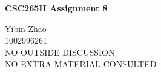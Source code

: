 \documentclass[10pt]{article}
\begin{document}
\begin{center}
{\bf \Large \bf CSC265H Assignment 8}
\end{center}

\noindent
Yibin Zhao\\
1002996261\\
NO OUTSIDE DISCUSSION\\
NO EXTRA MATERIAL CONSULTED\\

\begin{comment}
A black&white heap is a singly-linked list of binomial trees that satisfies the
following properties:
	The roots of the binomial trees in the list have strictly increasing
	degrees.
	The root of every binomial tree is white.
	If a white node is not the root of a binomial tree, its priority is greater
	than or equal to the priority of its parent.
	The black nodes all have different degrees.
	The degree od a black node is 1 less than the degree of its parent, i.e.
	the black node is the first child of its parent.

Recal that a node in a binomial heap has degree k if and only if the subtree
rooted at that node is a binomial tree with $2^k$ nodes.

We say that a linked-list of binomial trees is a k-black&while heap if it
satisfies all the properties of a black&white heap except that it has at
most two black nodes of degree k and at most one of its black nodes of degree k
has a parent of degree greater than $k+1$.
Thus for every natural number k, every black&white heap is a k-black&white
heap.
\end{comment}
\end{document}
